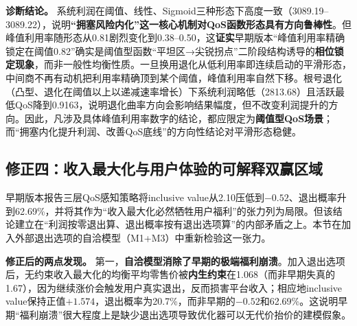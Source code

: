 \documentclass[UTF8,11pt]{ctexart}
\begin{document}
\textbf{诊断结论。} 系统利润在阈值、线性、Sigmoid三种形态下高度一致（3089.19--3089.22），说明\textbf{“拥塞风险内化”这一核心机制对QoS函数形态具有方向鲁棒性}。但峰值利用率随形态从0.81剧烈变化到0.38--0.50，这\textbf{证实}早期版本“峰值利用率精确锁定在阈值0.82”确实是阈值型函数“平坦区→尖锐拐点”二阶段结构诱导的\textbf{相位锁定现象}，而非一般性均衡性质。一旦换用退化从低利用率即连续启动的平滑形态，中间商不再有动机把利用率精确顶到某个阈值，峰值利用率自然下移。根号退化（凸型、退化在阈值以上以递减速率增长）下系统利润略低（2813.68）且活跃最低QoS降到0.9163，说明退化曲率方向会影响结果幅度，但不改变利润提升的方向。因此，凡涉及具体峰值利用率数字的结论，都应限定为\textbf{阈值型QoS场景}；而“拥塞内化提升利润、改善QoS底线”的方向性结论对平滑形态稳健。

\subsection{修正四：收入最大化与用户体验的可解释双赢区域}
\label{sec:welfare}

早期版本报告三层QoS感知策略将inclusive value从2.10压低到$-0.52$、退出概率升到62.69\%，并将其作为“收入最大化必然牺牲用户福利”的张力列为局限。但该结论建立在“利润按零退出算、退出概率按有退出选项算”的内部矛盾之上。本节在加入外部退出选项的自洽模型（M1+M3）中重新检验这一张力。

\begin{table}[H]
\centering
\caption{自洽模型（M1+M3，含退出选项）下的收入最大化与价格保护对比（重跑真实值）。}
\label{tab:welfare}
\small
{}
\end{table}

\textbf{修正后的两点发现。} 第一，\textbf{自洽模型消除了早期的极端福利崩溃}。加入退出选项后，无约束收入最大化的均衡平均零售价被\textbf{内生约束}在1.068（而非早期失真的1.67），因为继续涨价会触发用户真实退出，反而损害平台收入；相应地inclusive value保持正值$+1.574$，退出概率为20.7\%，而非早期的$-0.52$和62.69\%。这说明早期“福利崩溃”很大程度上是缺少退出选项导致优化器可以无代价抬价的建模假象。
\end{document}
